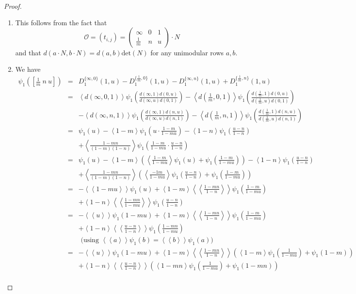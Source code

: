 \documentclass[12pt]{amsart}
\theoremstyle{definition}
\newcommand{\oct}{\mathcal{O}}%
\newcommand{\scyc}[1]{\left[ #1 \right]} %
\newcommand{\suss}[2]{\psi_{#1}\left( #2\right)}
\newcommand{\<}{\langle}
\renewcommand{\>}{\rangle}
\newcommand{\an}[1]{\left\langle{#1}\right\rangle}
\newcommand{\pf}[1]{\left\langle\!\left\langle{#1}\right\rangle\!\right\rangle}
\begin{document}
\begin{proof}
\begin{enumerate}
\item This follows from the fact that 
\[
\oct=(t_{i,j})=
\left(
\begin{array}{lll}
\infty&0&1\\
\frac{1}{m}&n&u
\end{array}
\right)\cdot N
\]
and that $d(a\cdot N, b\cdot N)=d(a,b)\mathrm{det}(N)$ for any unimodular rows $a,b$.
\item We have
\begin{eqnarray*}
\suss{1}{\scyc{\frac{1}{m}\  n\  u}}&=& D_1^{\{ \infty, 0\}}(1,u)-D_1^{\{ \frac{1}{m},0\}}(1,u)-D_1^{\{\infty,n\}}(1,u)+D_1^{\{ \frac{1}{m},n\}}(1,u)\\
&=&\an{d(\infty,0,1)}\suss{1}{\frac{d(\infty,1)d(0,u)}{d(\infty,u)d(0,1)}}-\an{d\left(\frac{1}{m},0,1\right)}\suss{1}{\frac{d(\frac{1}{m},1)d(0,u)}{d(\frac{1}{m},u)d(0,1)}}\\
&&-\an{d(\infty,n,1)}\suss{1}{\frac{d(\infty,1)d(n,u)}{d(\infty,u)d(n,1)}}-\an{d\left(\frac{1}{m},n,1\right)}\suss{1}{\frac{d(\frac{1}{m},1)d(n,u)}{d(\frac{1}{m},u)d(n,1)}}\\
&=&\suss{1}{u}-\an{1-m}\suss{1}{u\cdot\frac{1-m}{1-mu}}-\an{1-n}\suss{1}{\frac{u-n}{1-n}}\\
&&+\an{\frac{1-mn}{(1-m)(1-n)}}\suss{1}{\frac{1-m}{1-mu}\cdot\frac{u-n}{1-n}}\\
&=& \suss{1}{u}-\an{1-m}\left(\an{\frac{1-m}{1-mu}}\suss{1}{u}+\suss{1}{\frac{1-m}{1-mu}}\right)-\an{1-n}\suss{1}{\frac{u-n}{1-n}}\\
&&+\an{\frac{1-mn}{(1-m)(1-n)}}\left(\an{\frac{-1m}{1-mu}}\suss{1}{\frac{u-n}{1-n}}+\suss{1}{\frac{1-m}{1-mu}}\right)\\
&=&-\pf{1-mu}\suss{1}{u}+\an{1-m}\pf{\frac{1-mn}{1-n}}\suss{1}{\frac{1-m}{1-mu}}\\
&&+\an{1-n}\pf{\frac{1-mn}{1-mu}}\suss{1}{\frac{u-n}{1-n}}\\
&=&-\pf{u}\suss{1}{1-mu}+\an{1-m}\pf{\frac{1-mn}{1-n}}\suss{1}{\frac{1-m}{1-mu}}\\
&&+\an{1-n}\pf{\frac{u-n}{1-n}}\suss{1}{\frac{1-mn}{1-mu}}\\
&& \mbox{ (using $\pf{a}\suss{1}{b}=\pf{b}\suss{1}{a}$)}\\
&=&-\pf{u}\suss{1}{1-mu}+\an{1-m}\pf{\frac{1-mn}{1-n}}\left( \an{1-m}\suss{1}{\frac{1}{1-mu}}+\suss{1}{1-m}\right)\\
&&+\an{1-n}\pf{\frac{u-n}{1-n}}\left(\an{1-mn}\suss{1}{\frac{1}{1-mu}}+\suss{1}{1-mn}\right)\\

\end{eqnarray*}
\end{enumerate}
\end{proof}
\end{document}
